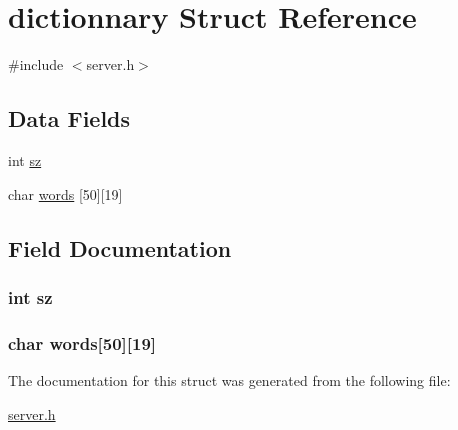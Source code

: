 \hypertarget{structdictionnary}{\section{dictionnary Struct Reference}
\label{structdictionnary}
}


{\ttfamily \#include $<$server.\+h$>$}

\subsection*{Data Fields}
\begin{DoxyCompactItemize}
\item 
int \hyperlink{structdictionnary_a0e1ea19fb9fa7881d15d84eff4c090e1}{sz}
\item 
char \hyperlink{structdictionnary_a6396b7a640038ae7ad9db9fb8c70b1e4}{words} \mbox{[}50\mbox{]}\mbox{[}19\mbox{]}
\end{DoxyCompactItemize}


\subsection{Field Documentation}
\hypertarget{structdictionnary_a0e1ea19fb9fa7881d15d84eff4c090e1}{
\subsubsection[{sz}]{\setlength{\rightskip}{0pt plus 5cm}int sz}}\label{structdictionnary_a0e1ea19fb9fa7881d15d84eff4c090e1}
\hypertarget{structdictionnary_a6396b7a640038ae7ad9db9fb8c70b1e4}{
\subsubsection[{words}]{\setlength{\rightskip}{0pt plus 5cm}char words\mbox{[}50\mbox{]}\mbox{[}19\mbox{]}}}\label{structdictionnary_a6396b7a640038ae7ad9db9fb8c70b1e4}


The documentation for this struct was generated from the following file\+:\begin{DoxyCompactItemize}
\item 
\hyperlink{server_8h}{server.\+h}\end{DoxyCompactItemize}

